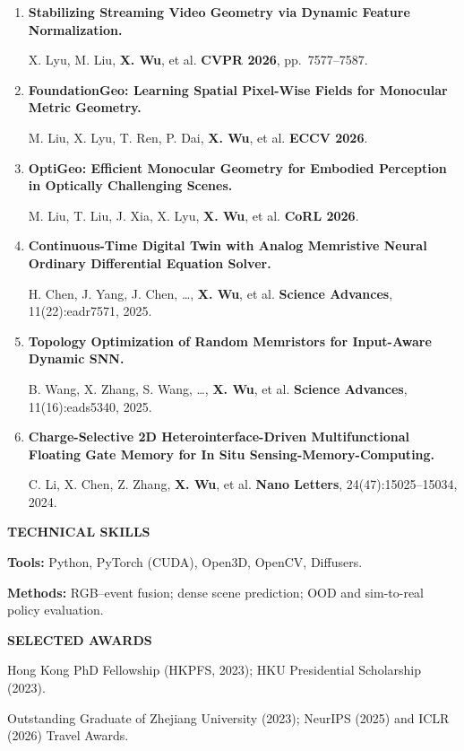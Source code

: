 \documentclass[a4paper]{article}
\newcommand{\cvsection}[1]{%
  \par\vspace{2.0pt}%
  {\color{cvblue}\fontsize{11}{12.2}\selectfont\bfseries\MakeUppercase{#1}}\par
  \vspace{-4pt}{\color{cvblue}\rule{\textwidth}{0.4pt}}\par\vspace{1.0pt}%
}
\begin{document}
{\begin{enumerate}[resume,leftmargin=1.6em,labelsep=0.38em,itemsep=0.4pt,topsep=1.3pt,parsep=0pt,partopsep=0pt]
Y. Yu, X. Zhang, S. Wang, \ldots, \textbf{X. Wu}, et al. \hfill \textbf{Nature}, 654:642--651, 2026.
\item \textbf{Stabilizing Streaming Video Geometry via Dynamic Feature Normalization.}\par
X. Lyu, M. Liu, \textbf{X. Wu}, et al. \hfill \textbf{CVPR 2026}, pp.\ 7577--7587.
\item \textbf{FoundationGeo: Learning Spatial Pixel-Wise Fields for Monocular Metric Geometry.}\par
M. Liu, X. Lyu, T. Ren, P. Dai, \textbf{X. Wu}, et al. \hfill \textbf{ECCV 2026}.
\item \textbf{OptiGeo: Efficient Monocular Geometry for Embodied Perception in Optically Challenging Scenes.}\par
M. Liu, T. Liu, J. Xia, X. Lyu, \textbf{X. Wu}, et al. \hfill \textbf{CoRL 2026}.
\item \textbf{Continuous-Time Digital Twin with Analog Memristive Neural Ordinary Differential Equation Solver.}\par
H. Chen, J. Yang, J. Chen, \ldots, \textbf{X. Wu}, et al. \hfill \textbf{Science Advances}, 11(22):eadr7571, 2025.
\item \textbf{Topology Optimization of Random Memristors for Input-Aware Dynamic SNN.}\par
B. Wang, X. Zhang, S. Wang, \ldots, \textbf{X. Wu}, et al. \hfill \textbf{Science Advances}, 11(16):eads5340, 2025.
\item \textbf{Charge-Selective 2D Heterointerface-Driven Multifunctional Floating Gate Memory for In Situ Sensing-Memory-Computing.}\par
C. Li, X. Chen, Z. Zhang, \textbf{X. Wu}, et al. \hfill \textbf{Nano Letters}, 24(47):15025--15034, 2024.
\end{enumerate}}

\cvsection{Technical Skills}
\textbf{Tools:} Python, PyTorch (CUDA), Open3D, OpenCV, Diffusers.\par
\textbf{Methods:} RGB--event fusion; dense scene prediction; OOD and sim-to-real policy evaluation.


\cvsection{Selected Awards}
Hong Kong PhD Fellowship (HKPFS, 2023); HKU Presidential Scholarship (2023).\par
Outstanding Graduate of Zhejiang University (2023); NeurIPS (2025) and ICLR (2026) Travel Awards.
\end{document}
